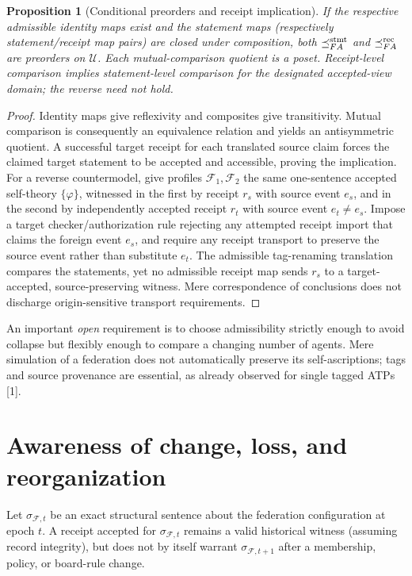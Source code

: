 \documentclass[10pt,letterpaper]{article}
\newtheorem{proposition}[definition]{Proposition}
\theoremstyle{remark}\newtheorem{remark}[definition]{Remark}
\newcommand{\F}{\mathcal{F}}
\begin{document}
\begin{proposition}[Conditional preorders and receipt implication]
If the respective admissible identity maps exist and the statement maps (respectively statement/receipt map pairs) are closed under composition, both $\preceq^{\rm stmt}_{FA}$ and $\preceq^{\rm rec}_{FA}$ are preorders on $\mathcal U$. Each mutual-comparison quotient is a poset. Receipt-level comparison implies statement-level comparison for the designated accepted-view domain; the reverse need not hold.
\end{proposition}
\begin{proof}
Identity maps give reflexivity and composites give transitivity. Mutual comparison is consequently an equivalence relation and yields an antisymmetric quotient. A successful target receipt for each translated source claim forces the claimed target statement to be accepted and accessible, proving the implication. For a reverse countermodel, give profiles $\F_1,\F_2$ the same one-sentence accepted self-theory $\{\varphi\}$, witnessed in the first by receipt $r_s$ with source event $e_s$, and in the second by independently accepted receipt $r_t$ with source event $e_t\ne e_s$. Impose a target checker/authorization rule rejecting any attempted receipt import that claims the foreign event $e_s$, and require any receipt transport to preserve the source event rather than substitute $e_t$. The admissible tag-renaming translation compares the statements, yet no admissible receipt map sends $r_s$ to a target-accepted, source-preserving witness. Mere correspondence of conclusions does not discharge origin-sensitive transport requirements.
\end{proof}

An important \emph{open} requirement is to choose admissibility strictly enough to avoid collapse but flexibly enough to compare a changing number of agents. Mere simulation of a federation does not automatically preserve its self-ascriptions; tags and source provenance are essential, as already observed for single tagged ATPs [1].

\section{Awareness of change, loss, and reorganization}
Let $\sigma_{\F,t}$ be an exact structural sentence about the federation configuration at epoch $t$. A receipt accepted for $\sigma_{\F,t}$ remains a valid historical witness (assuming record integrity), but does not by itself warrant $\sigma_{\F,t+1}$ after a membership, policy, or board-rule change.
\end{document}
